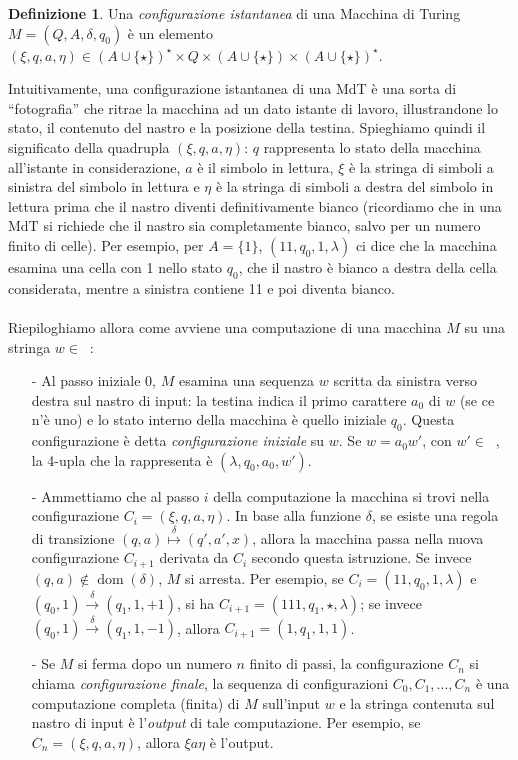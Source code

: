 \documentclass[12pt,a4paper]{report}
\theoremstyle{definition}
\newtheorem{defn}[teo]{Definizione}  %
\DeclareMathOperator{\dom}{dom}
\DeclareMathOperator{\aaa}{\textit{A}^{\star}}
\begin{document}
\begin{defn}
Una \emph{configurazione istantanea} di una Macchina di Turing $M=(Q,A,\delta,q_0)$ è un elemento $(\xi,q,a,\eta) \in (A \cup \{\star\})^{\star} \times Q \times (A \cup \{\star\}) \times (A \cup \{\star\})^{\star}$.
\end{defn}

Intuitivamente, una configurazione istantanea di una MdT è una sorta di ``fotografia'' che ritrae la macchina ad un dato istante di lavoro, illustrandone lo stato, il contenuto del nastro e la posizione della testina. Spieghiamo quindi il significato della quadrupla $(\xi,q,a,\eta)$: $q$ rappresenta lo stato della macchina all'istante in considerazione, $a$ è il simbolo in lettura, $\xi$ è la stringa di simboli a sinistra del simbolo in lettura e $\eta$ è la stringa di simboli a destra del simbolo in lettura prima che il nastro diventi definitivamente bianco (ricordiamo che in una MdT si richiede che il nastro sia completamente bianco, salvo per un numero finito di celle). Per esempio, per $A=\{1\}$, $(11,q_0,1,\lambda)$ ci dice che la macchina esamina una cella con 1 nello stato $q_0$, che il nastro è bianco a destra della cella considerata, mentre a sinistra contiene 11 e poi diventa bianco.\\
\\
Riepiloghiamo allora come avviene una computazione di una macchina $M$ su una stringa $w \in \aaa$:

\begin{itemize}
\item[-] Al passo iniziale 0, $M$ esamina una sequenza $w$ scritta da sinistra verso destra sul nastro di input: la testina indica il primo carattere $a_0$ di $w$ (se ce n'è uno) e lo stato interno della macchina è quello iniziale $q_0$. Questa configurazione è detta \emph{configurazione iniziale} su $w$. Se $w=a_0 w'$, con $w' \in \aaa$, la 4-upla che la rappresenta è $(\lambda,q_0,a_0,w')$.
\item[-] Ammettiamo che al passo $i$ della computazione la macchina si trovi nella configurazione $C_i = (\xi,q,a,\eta)$. In base alla funzione $\delta$, se esiste una regola di transizione $(q,a) \stackrel{\delta}{\mapsto} (q',a',x)$, allora la macchina passa nella nuova configurazione $C_{i+1}$ derivata da $C_i$ secondo questa istruzione. Se invece $(q,a) \not\in \dom(\delta)$, $M$ si arresta. Per esempio, se $C_i = (11,q_0,1,\lambda)$ e $(q_0,1) \stackrel{\delta}{\longrightarrow} (q_1,1,+1)$, si ha $C_{i+1} = (111,q_1,\star,\lambda)$; se invece $(q_0,1) \stackrel{\delta}{\longrightarrow} (q_1,1,-1)$, allora $C_{i+1} = (1,q_1,1,1)$.
\item[-] Se $M$ si ferma dopo un numero $n$ finito di passi, la configurazione $C_n$ si chiama \emph{configurazione finale}, la sequenza di configurazioni $C_0,C_1,...,C_n$ è una computazione completa (finita) di $M$ sull'input $w$ e la stringa contenuta sul nastro di input è l'\emph{output} di tale computazione. Per esempio, se $C_n = (\xi,q,a,\eta)$, allora $\xi a \eta$ è l'output.
\end{itemize}
\end{document}
